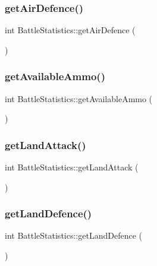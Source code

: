 \subsubsection{\texorpdfstring{getAirDefence()}{getAirDefence()}}
{\footnotesize\ttfamily int Battle\+Statistics\+::get\+Air\+Defence (\begin{DoxyParamCaption}{ }\end{DoxyParamCaption})}

\mbox{\label{class_battle_statistics_abd94f14d0b22780bfa8ca32863eb09c6}} 
\subsubsection{\texorpdfstring{getAvailableAmmo()}{getAvailableAmmo()}}
{\footnotesize\ttfamily int Battle\+Statistics\+::get\+Available\+Ammo (\begin{DoxyParamCaption}{ }\end{DoxyParamCaption})}

\mbox{\label{class_battle_statistics_afbc695f7a7004fad65494bb5959f4de8}} 
\subsubsection{\texorpdfstring{getLandAttack()}{getLandAttack()}}
{\footnotesize\ttfamily int Battle\+Statistics\+::get\+Land\+Attack (\begin{DoxyParamCaption}{ }\end{DoxyParamCaption})}

\mbox{\label{class_battle_statistics_add238d645102680c952341c7b3eb4231}} 
\subsubsection{\texorpdfstring{getLandDefence()}{getLandDefence()}}
{\footnotesize\ttfamily int Battle\+Statistics\+::get\+Land\+Defence (\begin{DoxyParamCaption}{ }\end{DoxyParamCaption})}

